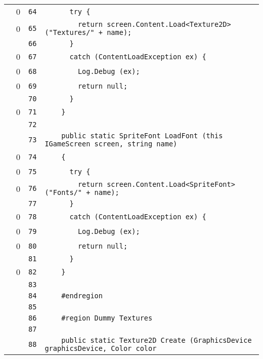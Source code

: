 \documentclass[a4paper,10pt]{article}
\begin{document}
\begin{longtable}[l]{lrrl}
\cellcolor{red} & 0 & \verb~64~ & \verb~      try {~\\
\cellcolor{red} & 0 & \verb~65~ & \verb~        return screen.Content.Load<Texture2D> ("Textures/" + name);~\\
\cellcolor{gray} &  & \verb~66~ & \verb~      }~\\
\cellcolor{red} & 0 & \verb~67~ & \verb~      catch (ContentLoadException ex) {~\\
\cellcolor{red} & 0 & \verb~68~ & \verb~        Log.Debug (ex);~\\
\cellcolor{red} & 0 & \verb~69~ & \verb~        return null;~\\
\cellcolor{gray} &  & \verb~70~ & \verb~      }~\\
\cellcolor{red} & 0 & \verb~71~ & \verb~    }~\\
\cellcolor{gray} &  & \verb~72~ & \verb~~\\
\cellcolor{gray} &  & \verb~73~ & \verb~    public static SpriteFont LoadFont (this IGameScreen screen, string name)~\\
\cellcolor{red} & 0 & \verb~74~ & \verb~    {~\\
\cellcolor{red} & 0 & \verb~75~ & \verb~      try {~\\
\cellcolor{red} & 0 & \verb~76~ & \verb~        return screen.Content.Load<SpriteFont> ("Fonts/" + name);~\\
\cellcolor{gray} &  & \verb~77~ & \verb~      }~\\
\cellcolor{red} & 0 & \verb~78~ & \verb~      catch (ContentLoadException ex) {~\\
\cellcolor{red} & 0 & \verb~79~ & \verb~        Log.Debug (ex);~\\
\cellcolor{red} & 0 & \verb~80~ & \verb~        return null;~\\
\cellcolor{gray} &  & \verb~81~ & \verb~      }~\\
\cellcolor{red} & 0 & \verb~82~ & \verb~    }~\\
\cellcolor{gray} &  & \verb~83~ & \verb~~\\
\cellcolor{gray} &  & \verb~84~ & \verb~    #endregion~\\
\cellcolor{gray} &  & \verb~85~ & \verb~~\\
\cellcolor{gray} &  & \verb~86~ & \verb~    #region Dummy Textures~\\
\cellcolor{gray} &  & \verb~87~ & \verb~~\\
\cellcolor{gray} &  & \verb~88~ & \verb~    public static Texture2D Create (GraphicsDevice graphicsDevice, Color color~\\

\end{longtable}
\end{document}
